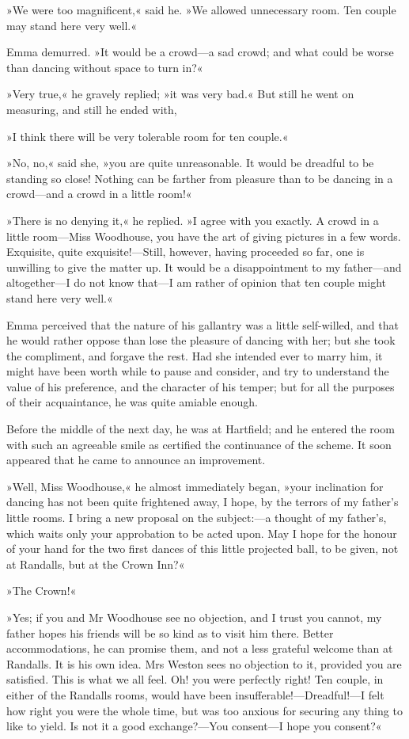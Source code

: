 »We were too magnificent,« said he. »We allowed unnecessary room. Ten couple may stand here very well.«

Emma demurred. »It would be a crowd—a sad crowd; and what could be worse than dancing without space to turn in?«

»Very true,« he gravely replied; »it was very bad.« But still he went on measuring, and still he ended with,

»I think there will be very tolerable room for ten couple.«

»No, no,« said she, »you are quite unreasonable. It would be dreadful to be standing so close! Nothing can be farther from pleasure than to be dancing in a crowd—and a crowd in a little room!«

»There is no denying it,« he replied. »I agree with you exactly. A crowd in a little room—Miss Woodhouse, you have the art of giving pictures in a few words. Exquisite, quite exquisite!—Still, however, having proceeded so far, one is unwilling to give the matter up. It would be a disappointment to my father—and altogether—I do not know that—I am rather of opinion that ten couple might stand here very well.«

Emma perceived that the nature of his gallantry was a little self-willed, and that he would rather oppose than lose the pleasure of dancing with her; but she took the compliment, and forgave the rest. Had she intended ever to marry him, it might have been worth while to pause and consider, and try to understand the value of his preference, and the character of his temper; but for all the purposes of their acquaintance, he was quite amiable enough.

Before the middle of the next day, he was at Hartfield; and he entered the room with such an agreeable smile as certified the continuance of the scheme. It soon appeared that he came to announce an improvement.

»Well, Miss Woodhouse,« he almost immediately began, »your inclination for dancing has not been quite frightened away, I hope, by the terrors of my father's little rooms. I bring a new proposal on the subject:—a thought of my father's, which waits only your approbation to be acted upon. May I hope for the honour of your hand for the two first dances of this little projected ball, to be given, not at Randalls, but at the Crown Inn?«

»The Crown!«

»Yes; if you and Mr Woodhouse see no objection, and I trust you cannot, my father hopes his friends will be so kind as to visit him there. Better accommodations, he can promise them, and not a less grateful welcome than at Randalls. It is his own idea. Mrs Weston sees no objection to it, provided you are satisfied. This is what we all feel. Oh! you were perfectly right! Ten couple, in either of the Randalls rooms, would have been insufferable!—Dreadful!—I felt how right you were the whole time, but was too anxious for securing any thing to like to yield. Is not it a good exchange?—You consent—I hope you consent?«

